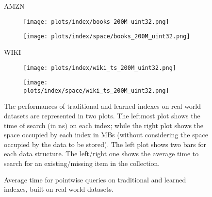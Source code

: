 \documentclass{article}
\begin{document}
\begin{figure}[!htbp]
{\begin{minipage}[t][0.98\textheight][t]{\textwidth}
    \begin{minipage}{0.05\linewidth}
    \begin{sideways}\small AMZN\end{sideways}
    \end{minipage}
    \begin{minipage}{0.32\linewidth}
        \begin{figure}[H]
        \texttt{[image: plots/index/books\_200M\_uint32.png]}
        \end{figure}
    \end{minipage}
    \begin{minipage}{0.32\linewidth}
        \begin{figure}[H]
            \texttt{[image: plots/index/space/books\_200M\_uint32.png]}
        \end{figure}
    \end{minipage}
    \vspace*{-16px}

    \begin{minipage}{0.05\linewidth}
    \begin{sideways}\small WIKI\end{sideways}
    \end{minipage}
    \begin{minipage}{0.32\linewidth}
        \begin{figure}[H]
        \texttt{[image: plots/index/wiki\_ts\_200M\_uint32.png]}
        \end{figure}
    \end{minipage}
    \begin{minipage}{0.32\linewidth}
        \begin{figure}[H]
            \texttt{[image: plots/index/space/wiki\_ts\_200M\_uint32.png]}
        \end{figure}
    \end{minipage}

    \vfill
    
    \centering
    \begin{minipage}{\linewidth}
        The performances of traditional and learned indexes on real-world datasets are represented in two plots. The leftmost plot shows the time of search (in ns) on each index; while the right plot shows the space occupied by each index in MBs (without considering the space occupied by the data to be stored). The left plot shows two bars for each data structure. The left/right one shows the average time to search for an existing/missing item in the collection.
    \end{minipage}
    \vspace{10px}
\end{minipage}
}
\caption{Average time for pointwise queries on traditional and learned indexes, built on real-world datasets.}
\end{figure}
\end{document}
